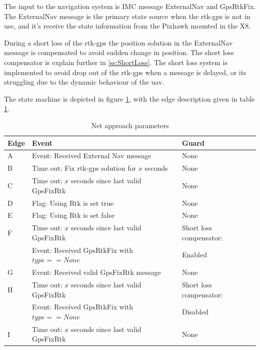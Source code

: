 The input to the navigation system is IMC message ExternalNav and GpsRtkFix. The ExternalNav message is the primary state source when the \gls{rtk-gps} is not in use, and it's receive the state information from the Pixhawk mounted in the X8.

During a short loss of the \gls{rtk-gps} the position solution in the ExternalNav message is compensated to avoid sudden change in position. The short loss compensator is explain further in \ref{ss:ShortLoss}. The short loss system is implemented to avoid drop out of the \gls{rtk-gps} when a message is delayed, or its struggling due to the dynamic behaviour of the \gls{uav}.

The state machine is depicted in figure \ref{Fig:NavState}, with the edge description given in table \ref{Tb:Nav state edge}.

\begin{figure}\label{Fig:NavState}
\def\svgwidth{\textwidth} %

\end{figure}
\begin{table}[H]

    \begin{tabular}{ | p{1cm} | p{8cm} | | p{4cm} |}
    \hline
    \textbf{Edge} 	& \textbf{Event} 										& \textbf{Guard} \\ \hline
    A 				& Event: Received External Nav message 					& None \\ \hline
    B 				& Time out: Fix \gls{rtk-gps} solution for $x$ seconds 	& None \\ \hline
    C 				& Time out: $x$ seconds since last valid GpsFixRtk 		& None \\ \hline
    D 				& Flag: Using Rtk is set true& None \\ \hline
    E 				& Flag: Using Rtk is set false& None \\ \hline
    F 				& Time out: $x$ seconds since last valid GpsFixRtk 		& Short loss compensator:\\ 
      				& Event: Received GpsRtkFix with $type==None$ 			& Enabled\\ \hline
    G 				& Event: Received valid GpsFixRtk message				& None \\ \hline
    H 				& Time out: $x$ seconds since last valid GpsFixRtk 		& Short loss compensator:\\
    				& Event: Received GpsRtkFix with $type==None$			& Disabled \\ \hline
    I 				& Time out: $x$ seconds since last valid GpsFixRtk 		& None \\ \hline
    \end{tabular}

\caption{Net approach parameters }
\label{Tb:Nav state edge}
\end{table}

